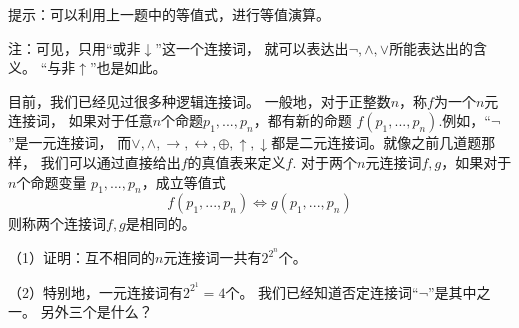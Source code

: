 
提示：可以利用上一题中的等值式，进行等值演算。\vs


注：可见，只用“或非$\downarrow$”这一个连接词，
就可以表达出$\neg,\wedge,\vee$所能表达出的含义。
“与非$\uparrow$”也是如此。\vs

\begin{prob}[一般的多元连接词]
目前，我们已经见过很多种逻辑连接词。
一般地，对于正整数$n$，称$f$为一个$n$元连接词，
如果对于任意$n$个命题$p_1,...,p_n$，都有新的命题
$f(p_1,...,p_n)$.例如，“$\neg$”是一元连接词，
而$\vee,\wedge,\rightarrow,\leftrightarrow,\oplus,
\uparrow,\downarrow$都是二元连接词。就像之前几道题那样，
我们可以通过直接给出$f$的真值表来定义$f$.
对于两个$n$元连接词$f,g$，如果对于$n$个命题变量
$p_1,...,p_n$，成立等值式
$$f(p_1,...,p_n)\Leftrightarrow g(p_1,...,p_n)$$
则称两个连接词$f,g$是相同的。

（1）证明：互不相同的$n$元连接词一共有$2^{2^n}$个。

（2）特别地，一元连接词有$2^{2^1}=4$个。
我们已经知道否定连接词“$\neg$”是其中之一。
另外三个是什么？
\end{prob}\vs

